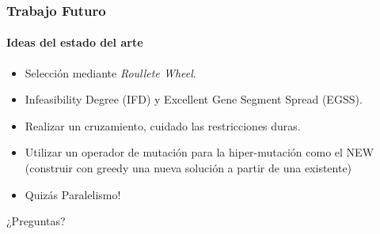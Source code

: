 \frame
{
\frametitle{Trabajo Futuro}
\framesubtitle{Ideas del estado del arte}
\begin{itemize}
	\item Selección mediante \emph{Roullete Wheel}.
	\item Infeasibility Degree (IFD) y Excellent Gene Segment Spread (EGSS).
	\item Realizar un cruzamiento, cuidado las restricciones duras.
	\item Utilizar un operador de mutación para la hiper-mutación como el NEW (construir con greedy una nueva solución a partir de una existente)
	\item Quizás Paralelismo! 
\end{itemize}
}

\frame
{
\vspace{1cm}
\begin{center}
	\Huge ¿Preguntas?
\end{center}
}
